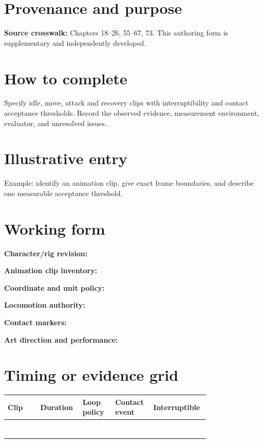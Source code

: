 \documentclass[10pt,letterpaper]{article}
\begin{document}
\makedoctitle
\makedocsummary

\section{Provenance and purpose}
\textbf{Source crosswalk:} Chapters 18--26, 55--67, 73. This authoring form is supplementary and independently developed.
\section{How to complete}
Specify idle, move, attack and recovery clips with interruptibility and contact acceptance thresholds. Record the observed evidence, measurement environment, evaluator, and unresolved issues. 
\section{Illustrative entry}
Example: identify an animation clip, give exact frame boundaries, and describe one measurable acceptance threshold.
\section{Working form}
\noindent\textbf{Character/rig revision:}\quad\hrulefill\par\vspace{10pt}
\noindent\textbf{Animation clip inventory:}\quad\hrulefill\par\vspace{10pt}
\noindent\textbf{Coordinate and unit policy:}\quad\hrulefill\par\vspace{10pt}
\noindent\textbf{Locomotion authority:}\quad\hrulefill\par\vspace{10pt}
\noindent\textbf{Contact markers:}\quad\hrulefill\par\vspace{10pt}
\noindent\textbf{Art direction and performance:}\quad\hrulefill\par\vspace{10pt}\section{Timing or evidence grid}
\begin{longtable}{|p{0.156\linewidth}|p{0.156\linewidth}|p{0.156\linewidth}|p{0.156\linewidth}|p{0.156\linewidth}|}
\hline
\textbf{Clip} & \textbf{Duration} & \textbf{Loop policy} & \textbf{Contact event} & \textbf{Interruptible}\\\hline
\endhead
\rule{0pt}{20pt} &  &  &  & \\\hline
\rule{0pt}{20pt} &  &  &  & \\\hline
\rule{0pt}{20pt} &  &  &  & \\\hline
\rule{0pt}{20pt} &  &  &  & \\\hline
\rule{0pt}{20pt} &  &  &  & \\\hline
\rule{0pt}{20pt} &  &  &  & \\\hline
\rule{0pt}{20pt} &  &  &  & \\\hline
\end{longtable}
\end{document}
